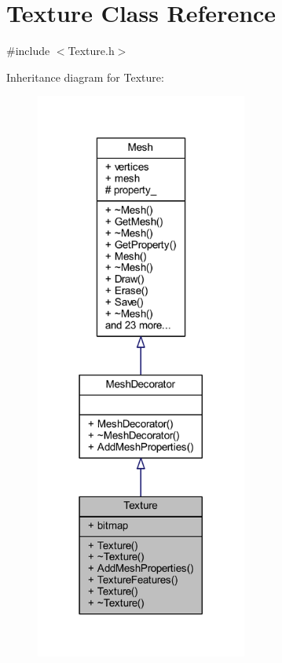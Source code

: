 \hypertarget{class_texture}{}\section{Texture Class Reference}
\label{class_texture}


{\ttfamily \#include $<$Texture.\+h$>$}



Inheritance diagram for Texture\+:\nopagebreak
\begin{figure}[H]
\begin{center}
\leavevmode
\includegraphics[width=197pt]{class_texture__inherit__graph}
\end{center}
\end{figure}


